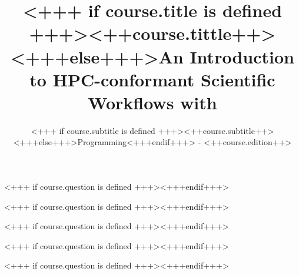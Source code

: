 \documentclass[english,xcolor=pdftex,dvipsnames,aspectratio=<+++ if course.aspectratio is defined +++><++course.aspectratio++><+++else+++>43<+++endif+++>]{beamer}
\title[<++course.shorttitle++>]{<+++ if course.title is defined +++><++course.tittle++><+++else+++>An Introduction to HPC-conformant Scientific Workflows with \Snakemake<+++endif+++>}
\subtitle{<+++ if course.subtitle is defined +++><++course.subtitle++><+++else+++>Programming<+++endif+++> - <++course.edition++>}
\begin{document}

\begin{frame}[plain] %
  \titlepage
\end{frame}














<+++ if course.question is defined +++><+++endif+++>


<+++ if course.question is defined +++><+++endif+++>
           

<+++ if course.question is defined +++><+++endif+++>
       

<+++ if course.question is defined +++><+++endif+++>
       

<+++ if course.question is defined +++><+++endif+++>
\end{document}
